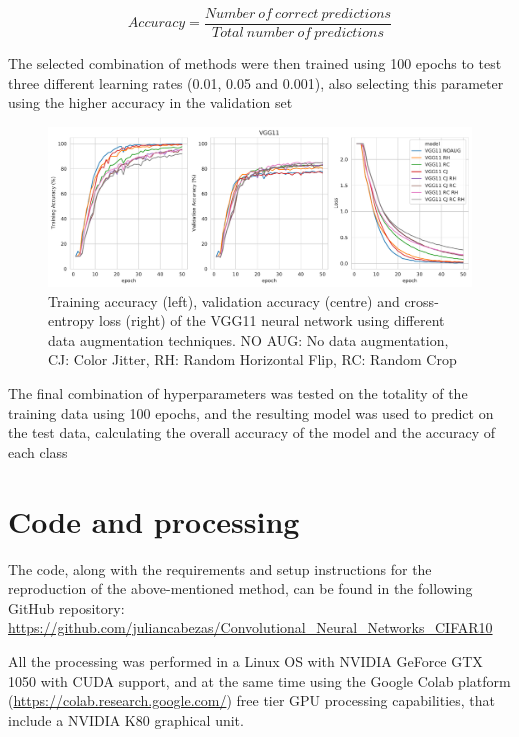 \documentclass[10pt,twocolumn,letterpaper]{article}
\begin{document}
\begin{equation}
	Accuracy = \frac{Number \: of \: correct \: predictions}{Total\: number\: of\: predictions}
\end{equation}

The selected combination of methods were then trained using 100 epochs to test three different learning rates (0.01, 0.05 and 0.001), also selecting this parameter using the higher accuracy in the validation set

\begin{figure}[h]
	\begin{center}
		\includegraphics[width=1.0\linewidth]{vgg11_aug.pdf}
		\caption{Training accuracy (left), validation accuracy (centre) and cross-entropy loss (right) of the VGG11 neural network using different data augmentation techniques. NO AUG: No data augmentation, CJ: Color Jitter, RH: Random Horizontal Flip, RC: Random Crop}
		\label{fig:vgg11-aug}
	\end{center}
\end{figure}

The final combination of hyperparameters was tested on the totality of the training data using 100 epochs, and the resulting model was used to predict on the test data, calculating the overall accuracy of the model and the accuracy of each class

\section{Code and processing}

The code, along with the requirements and setup instructions for the reproduction of the above-mentioned method, can be found in the following GitHub repository: \url{https://github.com/juliancabezas/Convolutional_Neural_Networks_CIFAR10} 

All the processing was performed in a Linux OS with NVIDIA GeForce GTX 1050 with CUDA support, and at the same time using the Google Colab platform (\url{https://colab.research.google.com/}) free tier GPU processing capabilities, that include a NVIDIA K80 graphical unit.
\end{document}
